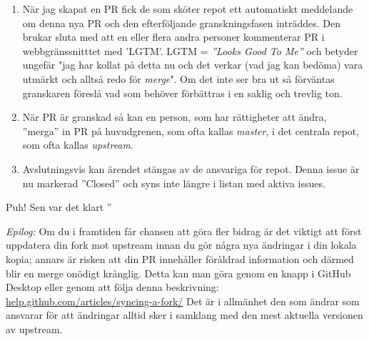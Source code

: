 \begin{enumerate}
\item När jag skapat en PR fick de som sköter repot ett automatiskt meddelande om denna nya PR och den efterföljande granskningsfasen inträddes. Den brukar sluta med att en eller flera andra personer kommenterar PR i webbgränssnitttet med 'LGTM'. LGTM = \emph{''Looks Good To Me''} och betyder ungefär "jag har kollat på detta nu och det verkar (vad jag kan bedöma) vara utmärkt och alltså redo för \emph{merge}". Om det inte ser bra ut så förväntas granskaren föreslå vad som behöver förbättras i en saklig och trevlig ton.

\item När PR är granskad så kan en person, som har rättigheter att ändra, ''merga'' in PR på huvudgrenen, som ofta kallas \emph{master}, i det centrala repot, som ofta kallas \emph{upstream}.

\item Avslutningsvis kan ärendet stängas av de ansvariga för repot. Denna issue är nu markerad ''Closed'' och syns inte längre i listan med aktiva issues. 

\end{enumerate}

Puh! Sen var det klart \code{:)} ''

\vspace{1em}\noindent\emph{Epilog:} Om du i framtiden får chansen att göra fler bidrag är det viktigt att först uppdatera din fork mot upstream innan du gör några nya ändringar i din lokala kopia; annars är risken att din PR innehåller föråldrad information och därmed blir en merge onödigt krånglig. Detta kan man göra genom en knapp i GitHub Desktop eller genom att följa denna beskrivning: \href{https://help.github.com/articles/syncing-a-fork/}{help.github.com/articles/syncing-a-fork/} Det är i allmänhet den som ändrar som ansvarar för att ändringar alltid sker i samklang med den mest aktuella versionen av upstream.
